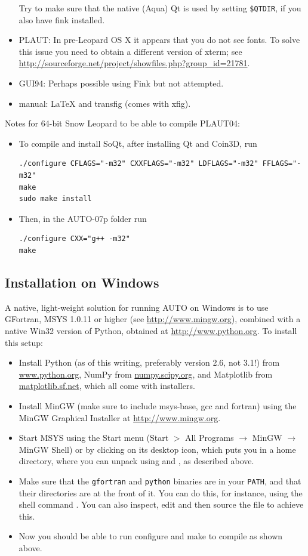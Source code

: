 \documentclass[12pt]{report}
\begin{document}
\begin{itemize}
Try to make sure that the native (Aqua) Qt
is used by setting {\tt \$QTDIR}, if you also have fink installed.
\item {\cal PLAUT}: In pre-Leopard OS X it appears that you do not see
fonts. To solve this issue you need to obtain a different
version of xterm; see
\url{http://sourceforge.net/project/showfiles.php?group_id=21781}.
\item GUI94: Perhaps possible using Fink but not attempted.
\item manual: \LaTeX\xspace and transfig (comes with xfig).
\end{itemize}

Notes for 64-bit Snow Leopard to be able to compile PLAUT04:
\begin{itemize}
\item
To compile and install SoQt, after installing Qt and Coin3D, run
\begin{verbatim}
./configure CFLAGS="-m32" CXXFLAGS="-m32" LDFLAGS="-m32" FFLAGS="-m32"
make
sudo make install
\end{verbatim}
\item
Then, in the AUTO-07p folder run
\begin{verbatim}
./configure CXX="g++ -m32"
make
\end{verbatim}
\end{itemize}

\subsection{Installation on Windows}
A native, light-weight solution for running AUTO on Windows is
to use GFortran, MSYS 1.0.11 or higher (see \url{http://www.mingw.org}),
combined with a native Win32 version of Python,
obtained at \url{http://www.python.org}. To install this setup:
\begin{itemize}
\item
Install Python (as of this writing, preferably version 2.6, not 3.1!)
from \url{www.python.org}, NumPy from \url{numpy.scipy.org},
and Matplotlib from \url{matplotlib.sf.net}, which all come
with installers.
\item
Install MinGW (make sure to include msys-base, gcc and fortran)
using the MinGW Graphical Installer at \url{http://www.mingw.org}.
\item
Start MSYS using the Start menu (Start $>$ All Programs $\to$ MinGW
$\to$ MinGW Shell) or by clicking on its desktop icon, which
puts you in a home directory, where you can unpack
\AUTO using  and , as described above.
\item
Make sure that the {\tt gfortran} and {\tt python} binaries
are in your {\tt PATH}, and that their directories are at the front of it.
You can do this, for instance, using the shell command
.
You can also inspect, edit and then source the file
 to achieve this.
\item
Now you should be able to run configure and make to compile \AUTO
as shown above.
\end{itemize}
\end{document}
